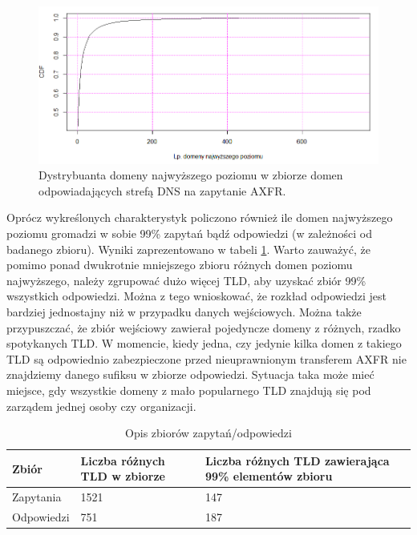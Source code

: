 \begin{figure}[h]
	\centering
	\includegraphics[width=1.0\textwidth]{image/cdf_tld_resp_no_title}
	\caption{Dystrybuanta domeny najwyższego poziomu w zbiorze domen odpowiadających strefą DNS na zapytanie AXFR.}
	\label{cdf_tld_resp}
\end{figure}


Oprócz wykreślonych charakterystyk policzono również ile domen najwyższego poziomu gromadzi w sobie 99\% zapytań bądź odpowiedzi
(w zależności od badanego zbioru). Wyniki zaprezentowano w tabeli \ref{cdf_table}. Warto zauważyć, że pomimo ponad dwukrotnie
mniejszego zbioru różnych domen poziomu najwyższego, należy zgrupować dużo więcej TLD, aby uzyskać zbiór 99\% wszystkich odpowiedzi.
Można z tego wnioskować, że rozkład odpowiedzi jest bardziej jednostajny niż w przypadku danych wejściowych. Można także przypuszczać,
że zbiór wejściowy zawierał pojedyncze domeny z różnych, rzadko spotykanych TLD. W momencie, kiedy jedna, czy jedynie kilka domen
z takiego TLD są odpowiednio zabezpieczone przed nieuprawnionym transferem AXFR nie znajdziemy danego sufiksu w zbiorze odpowiedzi.
Sytuacja taka może mieć miejsce, gdy wszystkie domeny z mało popularnego TLD znajdują się pod zarządem jednej osoby czy organizacji.

\begin{table}[h]
	\centering
	\caption{Opis zbiorów zapytań/odpowiedzi}
	\label{cdf_table}
	\begin{tabular}{|p{}|p{}|p{}|}
		\hline
		\textbf{Zbiór} &
		\textbf{Liczba różnych TLD w zbiorze} &
		\textbf{Liczba różnych TLD zawierająca 99\% elementów zbioru} \\
		\hline\hline
		Zapytania &
		1521 &
		147\\
		\hline
		Odpowiedzi &
		751 &
		187\\
		\hline
	\end{tabular}
\end{table}

